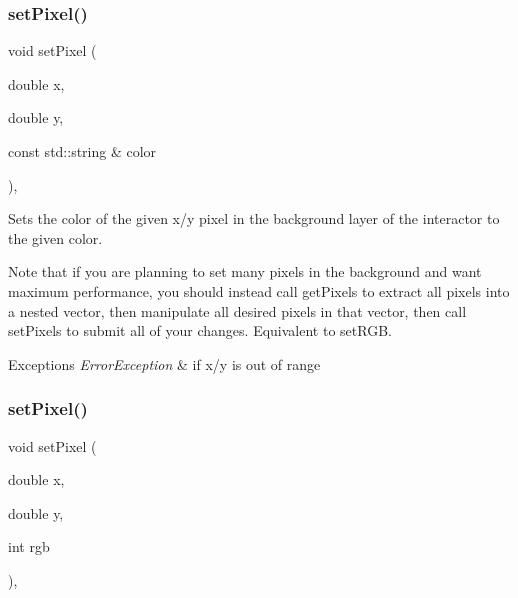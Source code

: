 \subsubsection{\texorpdfstring{set\+Pixel()}{setPixel()}\hspace{0.1cm}{\footnotesize\ttfamily [1/3]}}
{\footnotesize\ttfamily void set\+Pixel (\begin{DoxyParamCaption}\item[{double}]{x,  }\item[{double}]{y,  }\item[{const std\+::string \&}]{color }\end{DoxyParamCaption})\hspace{0.3cm}{\ttfamily [virtual]}, {\ttfamily [inherited]}}



Sets the color of the given x/y pixel in the background layer of the interactor to the given color. 

Note that if you are planning to set many pixels in the background and want maximum performance, you should instead call get\+Pixels to extract all pixels into a nested vector, then manipulate all desired pixels in that vector, then call set\+Pixels to submit all of your changes. Equivalent to set\+R\+GB.


\begin{DoxyExceptions}{Exceptions}
{\em Error\+Exception} & if x/y is out of range \\
\hline
\end{DoxyExceptions}
\mbox{\label{classsgl_1_1GForwardDrawingSurface_a05b3441e912e4c0ed45e9ed43bb745d1}} 
\subsubsection{\texorpdfstring{set\+Pixel()}{setPixel()}\hspace{0.1cm}{\footnotesize\ttfamily [2/3]}}
{\footnotesize\ttfamily void set\+Pixel (\begin{DoxyParamCaption}\item[{double}]{x,  }\item[{double}]{y,  }\item[{int}]{rgb }\end{DoxyParamCaption})\hspace{0.3cm}{\ttfamily [override]}, {\ttfamily [inherited]}}

